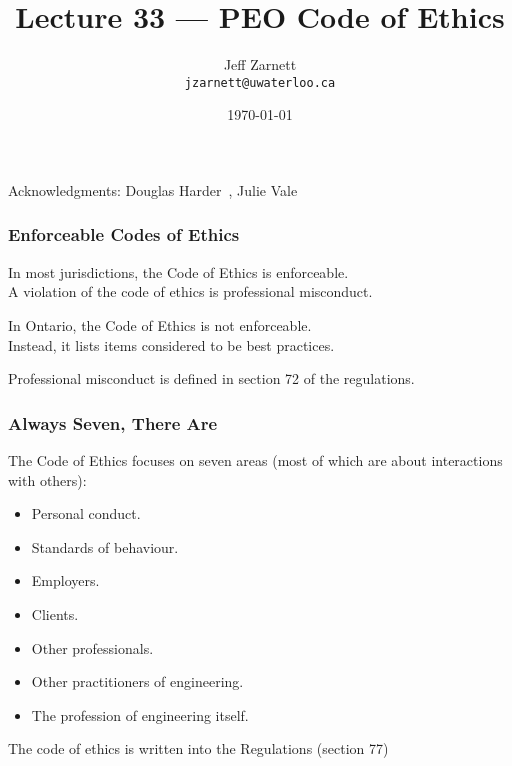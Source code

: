 

\title{Lecture 33 --- PEO Code of Ethics }

\author{Jeff Zarnett \\ \small \texttt{jzarnett@uwaterloo.ca}}
\date{\today}




\begin{frame}
  \titlepage

\begin{center}
  \small{Acknowledgments: Douglas Harder~\cite{dwh}, Julie Vale~\cite{jv}}
  \end{center}
\end{frame}



\begin{frame}
\frametitle{Enforceable Codes of Ethics}


In most jurisdictions, the Code of Ethics is enforceable.\\
\quad A violation of the code of ethics is professional misconduct.


In Ontario, the Code of Ethics is not enforceable.\\
\quad Instead, it lists items considered to be best practices.

Professional misconduct is defined in section 72 of the regulations.

\end{frame}




\begin{frame}
\frametitle{Always Seven, There Are}

The Code of Ethics focuses on seven areas (most of which are about interactions with others):

\begin{itemize}
	\item Personal conduct.
	\item Standards of behaviour.
	\item Employers.
	\item Clients.
	\item Other professionals.
	\item Other practitioners of engineering.
	\item The profession of engineering itself.
\end{itemize}

The code of ethics is written into the Regulations (section 77)

\end{frame}



